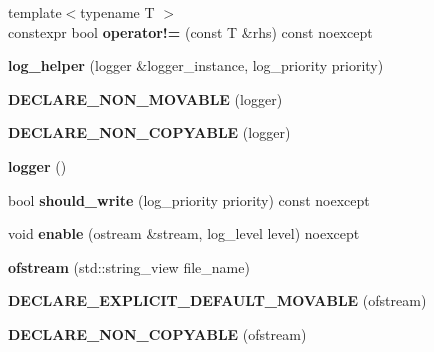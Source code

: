 \begin{CompactItemize}
\item 
\hypertarget{classhope_1_1final_4b5cc4ae2e43b62d9158d81c4f006f04}{
{\footnotesize template$<$typename T $>$ }\\constexpr bool \textbf{operator!=} (const T \&rhs) const noexcept}
\label{classhope_1_1final_4b5cc4ae2e43b62d9158d81c4f006f04}

\item 
\hypertarget{classhope_1_1final_aa957103cc4e6eb1d1587f4661b156e3}{
\textbf{log\_\-helper} (logger \&logger\_\-instance, log\_\-priority priority)}
\label{classhope_1_1final_aa957103cc4e6eb1d1587f4661b156e3}

\item 
\hypertarget{classhope_1_1final_43d3abf0a86be5751c9bcb5f121a43d8}{
\textbf{DECLARE\_\-NON\_\-MOVABLE} (logger)}
\label{classhope_1_1final_43d3abf0a86be5751c9bcb5f121a43d8}

\item 
\hypertarget{classhope_1_1final_7f42494e735fa3d7bfb969e945523987}{
\textbf{DECLARE\_\-NON\_\-COPYABLE} (logger)}
\label{classhope_1_1final_7f42494e735fa3d7bfb969e945523987}

\item 
\hypertarget{classhope_1_1final_76c2c3b7f0d8a66c818712b363c4e0d7}{
\textbf{logger} ()}
\label{classhope_1_1final_76c2c3b7f0d8a66c818712b363c4e0d7}

\item 
\hypertarget{classhope_1_1final_47b1e969a1eaca3c57b6b64bd0ddedab}{
bool \textbf{should\_\-write} (log\_\-priority priority) const noexcept}
\label{classhope_1_1final_47b1e969a1eaca3c57b6b64bd0ddedab}

\item 
\hypertarget{classhope_1_1final_49380a5aeb332d35a7bad7c86eec1ec2}{
void \textbf{enable} (ostream \&stream, log\_\-level level) noexcept}
\label{classhope_1_1final_49380a5aeb332d35a7bad7c86eec1ec2}

\item 
\hypertarget{classhope_1_1final_d84e14f532b5943dc5330c604ea26e59}{
\textbf{ofstream} (std::string\_\-view file\_\-name)}
\label{classhope_1_1final_d84e14f532b5943dc5330c604ea26e59}

\item 
\hypertarget{classhope_1_1final_e7e5b0b60acb8d4b0eb14cf96f54d76b}{
\textbf{DECLARE\_\-EXPLICIT\_\-DEFAULT\_\-MOVABLE} (ofstream)}
\label{classhope_1_1final_e7e5b0b60acb8d4b0eb14cf96f54d76b}

\item 
\hypertarget{classhope_1_1final_326e577f49062cd597bbcc630d38cbaf}{
\textbf{DECLARE\_\-NON\_\-COPYABLE} (ofstream)}
\label{classhope_1_1final_326e577f49062cd597bbcc630d38cbaf}


\end{CompactItemize}
